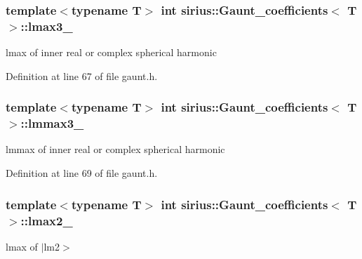 \subsubsection[{lmax3\+\_\+}]{\setlength{\rightskip}{0pt plus 5cm}template$<$typename T$>$ int {\bf sirius\+::\+Gaunt\+\_\+coefficients}$<$ T $>$\+::lmax3\+\_\+\hspace{0.3cm}{\ttfamily [private]}}\label{classsirius_1_1_gaunt__coefficients_a9491247cb6d44417403af75a42aac68a}


lmax of inner real or complex spherical harmonic 



Definition at line 67 of file gaunt.\+h.

\hypertarget{classsirius_1_1_gaunt__coefficients_abc22062f4949905eb01ea1ed6d82eb79}{}
\subsubsection[{lmmax3\+\_\+}]{\setlength{\rightskip}{0pt plus 5cm}template$<$typename T$>$ int {\bf sirius\+::\+Gaunt\+\_\+coefficients}$<$ T $>$\+::lmmax3\+\_\+\hspace{0.3cm}{\ttfamily [private]}}\label{classsirius_1_1_gaunt__coefficients_abc22062f4949905eb01ea1ed6d82eb79}


lmmax of inner real or complex spherical harmonic 



Definition at line 69 of file gaunt.\+h.

\hypertarget{classsirius_1_1_gaunt__coefficients_adac237ddd6c522f74e5f97e1ebcaceb9}{}
\subsubsection[{lmax2\+\_\+}]{\setlength{\rightskip}{0pt plus 5cm}template$<$typename T$>$ int {\bf sirius\+::\+Gaunt\+\_\+coefficients}$<$ T $>$\+::lmax2\+\_\+\hspace{0.3cm}{\ttfamily [private]}}\label{classsirius_1_1_gaunt__coefficients_adac237ddd6c522f74e5f97e1ebcaceb9}


lmax of $\vert$lm2$>$ 



